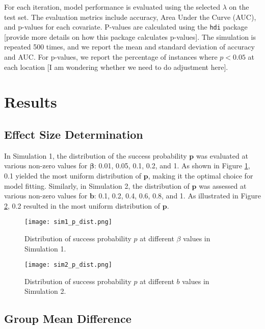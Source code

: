 \documentclass[12pt]{article}
\begin{document}
For each iteration, model performance is evaluated using the selected \( \lambda \) on the test set. The evaluation metrics include accuracy, Area Under the Curve (AUC), and p-values for each covariate. P-values are calculated using the \texttt{hdi} package [provide more details on how this package calculates p-values]. The simulation is repeated 500 times, and we report the mean and standard deviation of accuracy and AUC. For p-values, we report the percentage of instances where \( p < 0.05 \) at each location [I am wondering whether we need to do adjustment here].


\section*{Results}

\subsection*{Effect Size Determination}

In Simulation 1, the distribution of the success probability \( \mathbf{p} \) was evaluated at various non-zero values for \( \boldsymbol{\beta} \): 0.01,
0.05, 0.1, 0.2, and 1. As shown in Figure \ref{fig:sim1_p_dist}, 0.1 yielded the most uniform distribution
of \( \mathbf{p} \), making it the optimal choice for model fitting. Similarly, in Simulation 2, the distribution of \( \mathbf{p} \) was assessed at various non-zero values for \( \mathbf{b} \): 0.1, 0.2, 0.4, 0.6, 0.8, and 1. As illustrated in Figure \ref{fig:sim2_p_dist}, 0.2 resulted in the most uniform distribution of \( \mathbf{p} \).

\begin{figure}[h!]
	\centering
	\texttt{[image: sim1\_p\_dist.png]}
	\caption{Distribution of success probability \( p \) at different \( \beta \) values in Simulation 1.}
	\label{fig:sim1_p_dist}
\end{figure}

\begin{figure}[h!]
	\centering
	\texttt{[image: sim2\_p\_dist.png]}
	\caption{Distribution of success probability \( p \) at different \( b \) values in Simulation 2.}
	\label{fig:sim2_p_dist}
\end{figure}

\FloatBarrier

\subsection*{Group Mean Difference}
\end{document}

